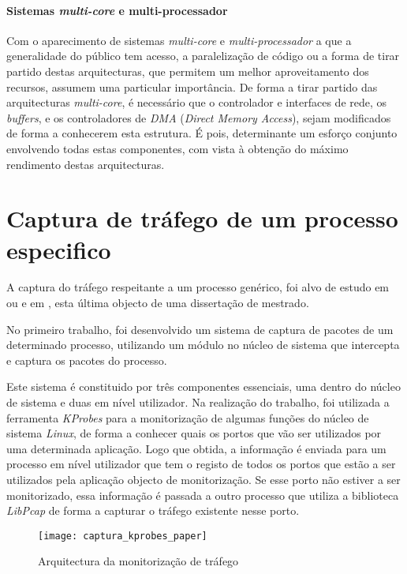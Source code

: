 \paragraph*{Sistemas \textit{multi-core} e multi-processador}

Com o aparecimento de sistemas \textit{multi-core} e \textit{multi-processador} a que a generalidade do público tem acesso, a paralelização de código ou a forma de tirar partido destas arquitecturas, que permitem um melhor aproveitamento dos recursos, assumem uma particular importância.
De forma a tirar partido das arquitecturas \textit{multi-core}, é necessário que o controlador e interfaces de rede, os \textit{buffers}, e os controladores de \textit{DMA} (\textit{Direct Memory Access}), sejam modificados de forma a conhecerem esta estrutura.
É pois, determinante um esforço conjunto envolvendo todas estas componentes, com vista à obtenção do máximo rendimento destas arquitecturas\cite{Deri:2010}.
 
\section{Captura de tráfego de um processo especifico}
\label{sect:outras_abordagens}

A captura do tráfego respeitante a um processo genérico, foi alvo de estudo em \cite{1688981} ou e em \cite{Farruca:2009}, esta última objecto de uma dissertação de mestrado.

No primeiro trabalho, foi desenvolvido um sistema de captura de pacotes de um determinado processo, utilizando um módulo no núcleo de sistema que intercepta e captura os pacotes do processo.

Este sistema é constituido por três componentes essenciais, uma dentro do núcleo de sistema e duas em nível utilizador.
Na realização do trabalho, foi utilizada a ferramenta \textit{KProbes} para a monitorização de algumas funções do núcleo de sistema \textit{Linux}, de forma a conhecer quais os portos que vão ser utilizados por uma determinada aplicação.
Logo que obtida, a informação é enviada para um processo em nível utilizador que tem o registo de todos os portos que estão a ser utilizados pela aplicação objecto de monitorização.
Se esse porto não estiver a ser monitorizado, essa informação é passada a outro processo que utiliza a biblioteca \textit{LibPcap} de forma a capturar o tráfego existente nesse porto.


\begin{figure}[h!]
       \centering
       \texttt{[image: captura\_kprobes\_paper]}
       \caption{Arquitectura da monitorização de tráfego}
	\label{fig:paper_capture_kprobes}
\end{figure}


